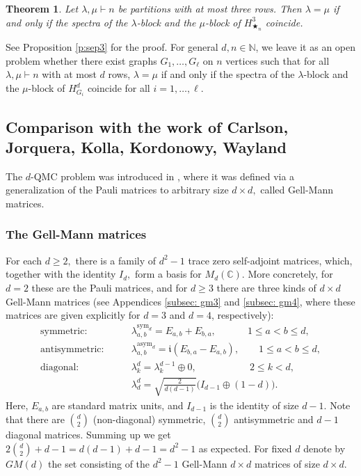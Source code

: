 \documentclass[12pt,dvipsnames,accepted=2016-08-18,a4paper,onecolumn]{quantumarticle}
\def\starn{{\bigstar_{n}}}
\numberwithin{equation}{section}
\newcommand{\N}{\mathbb N}
\newcommand{\CC}{\mathbb C}
\newtheorem{theorem}{Theorem}[section]
\theoremstyle{definition}
\begin{document}
\begin{theorem}\label{th:sep}
Let $\lambda,\mu\vdash n$ be partitions with at most three rows.
Then $\lambda=\mu$ if and only if the spectra of the $\lambda$-block and the $\mu$-block of $H_{\starn}^3$ coincide.
\end{theorem}

See Proposition \ref{p:sep3} for the proof.
For general $d,n\in\N$, we leave it as an open problem whether there exist graphs $G_1,\dots,G_\ell$ on $n$ vertices such that for all $\lambda,\mu\vdash n$ with at most $d$ rows, $\lambda=\mu$ if and only if the spectra of the $\lambda$-block and the $\mu$-block of $H_{G_i}^d$ coincide for all $i=1,\dots,\ell$.



\subsection{Comparison with the work of Carlson, Jorquera, Kolla, Kordonowy, Wayland}\label{sec:gm} The $d$-QMC problem was  introduced in \cite{CJKKW23+}, where it was defined via a generalization of the Pauli matrices to arbitrary size $d\times d,$ called {Gell-Mann matrices}. 

\subsubsection{The Gell-Mann matrices} \label{subsec:gm} For each $d \ge 2,$ there is a family of $d^2-1$ trace zero self-adjoint matrices, which, together with the identity $I_d,$ form a basis for $M_d(\CC).$
More concretely, for $d=2$ these are the Pauli matrices, and for  $d\ge3$ there are three kinds of $d \times d$ Gell-Mann matrices (see Appendices \ref{subsec: gm3} and \ref{subsec: gm4}, where these matrices are given explicitly for $d=3$ and $d=4$, respectively):
\begin{equation}
\begin{split}
	\text{symmetric:}\quad \quad \quad \ \  &\lambda_{a,b}^{\text{sym}_d} = E_{a,b} + E_{b,a},\quad \quad \quad \ 1\leq a<b \leq d, \\
	\text{antisymmetric:} \quad \quad&\lambda_{a,b}^{\text{asym}_d} = \mathfrak{i}(E_{b,a} - E_{a,b}),\quad \quad 1\leq a<b \leq d, \\
	\text{diagonal:}\quad \quad \quad \quad \ \,
	&\lambda_k^d = \lambda_k^{d-1} \oplus 0, \quad \quad \quad \quad \quad \ \ 2\leq k < d,\\
	&\lambda_d^d = \sqrt{\frac{2}{d(d-1)}}\big(I_{d-1} \oplus (1-d)\big).
\end{split}
\end{equation}
Here, $E_{a,b}$ are standard matrix units, and $I_{d-1}$ is the identity  of size $d-1.$
Note that there are $\binom{d}{2}$ (non-diagonal) symmetric, $\binom{d}{2}$ antisymmetric and $d-1$ diagonal matrices. Summing up we get $2\binom{d}{2} + d-1 = d(d-1)+d-1 = d^2-1$ as expected.
For fixed $d$ denote by $GM(d)$ the set consisting of the $d^2-1$ Gell-Mann $d\times d$ matrices of size $d \times d$.
\end{document}
